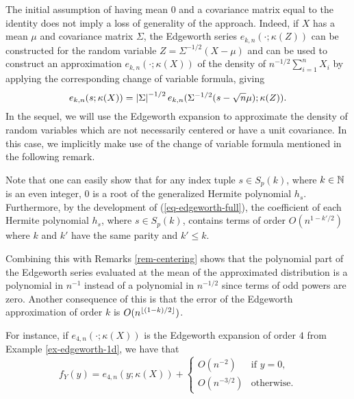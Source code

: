 \begin{remark} \label{rem-centering}
    The initial assumption of having mean 0 and a covariance matrix equal to the identity does not imply a loss of generality of the approach. Indeed, if $X$ has a mean $\mu$ and covariance matrix $\Sigma$, the Edgeworth series $e_{k, n}(\cdot; \kappa(Z))$ can be constructed for the random variable $Z = \Sigma^{-1/2}(X - \mu)$ and can be used to construct an approximation $e_{k, n}(\cdot; \kappa(X))$ of the density of $n^{-1/2} \sum_{i=1}^n X_i$ by applying the corresponding change of variable formula, giving
    \begin{equation*}
        e_{k, n}(s; \kappa(X)) = \left|\Sigma\right|^{-1/2} e_{k, n}(\Sigma^{-1/2}(s - \sqrt{n}\mu); \kappa(Z)).
    \end{equation*}
    In the sequel, we will use the Edgeworth expansion to approximate the density of random variables which are not necessarily centered or have a unit covariance. In this case, we implicitly make use of the change of variable formula mentioned in the following remark. 
\end{remark}


\begin{remark} \label{rem-edge-mean}
    Note that one can easily show that for any index tuple $s \in S_p(k)$, where $k \in \mathbb{N}$ is an even integer, 0 is a root of the generalized Hermite polynomial $h_s$. 
    Furthermore, by the development of (\ref{eq-edgeworth-full}), the coefficient of each Hermite polynomial $h_s$, where $s \in S_p(k)$, contains terms of order $O(n^{1-k'/2})$ where $k$ and $k'$ have the same parity and $k' \leq k$.

    Combining this with Remarks \ref{rem-centering} shows that the polynomial part of the Edgeworth series evaluated at the mean of the approximated distribution is a polynomial in $n^{-1}$ instead of a polynomial in $n^{-1/2}$ since terms of odd powers are zero. Another consequence of this is that the error of the Edgeworth approximation of order $k$ is $O(n^{\lfloor(1-k)/2\rfloor})$. 
    
    For instance, if $e_{4, n}(\cdot; \kappa(X))$ is the Edgeworth expansion of order $4$ from Example \ref{ex-edgeworth-1d}, we have that
    \begin{equation*}
        f_Y(y) = e_{4, n}(y; \kappa(X)) + \begin{cases}
            O(n^{-2}) &\text{if } y = 0,\\
            O(n^{-3/2}) &\text{otherwise}.
        \end{cases} 
    \end{equation*} 
\end{remark}
